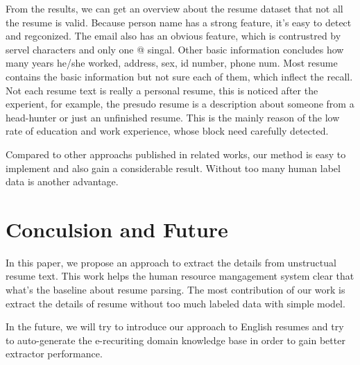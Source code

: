 \documentclass{acm_proc_article-sp}
\begin{document}
From the results, we can get an overview about the resume dataset that not all the resume is valid.
Because person name has a strong feature, it's easy to detect and regconized.
The email also has an obvious feature, which is contrustred by servel characters and only one @ singal.
Other basic information concludes how many years he/she worked, address, sex, id number, phone num.
Most resume contains the basic information but not sure each of them, which inflect the recall.
Not each resume text is really a personal resume, this is noticed after the experient, for example, the presudo resume is a description about someone from a head-hunter or just an unfinished resume.
This is the mainly reason of the low rate of education and work experience, whose block need carefully detected.

Compared to other approachs published in related works, our method is easy to implement and also gain a considerable result.
Without too many human label data is another advantage.


\section{Conculsion and Future}

In this paper, we propose an approach to extract the details from unstructual resume text. 
This work helps the human resource mangagement system clear that what's the baseline about resume parsing.
The most contribution of our work is extract the details of resume without too much labeled data with simple model.

In the future, we will try to introduce our approach to English resumes and try to auto-generate the e-recuriting domain knowledge base in order to gain better extractor performance.



 
\end{document}
